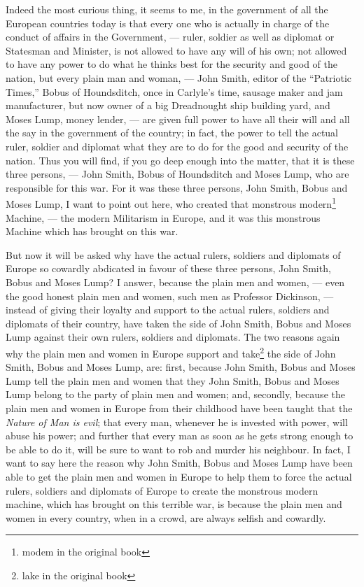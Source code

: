 Indeed the most curious thing, it seems to me, in the government of all the European countries today is that every one who is actually in charge of the conduct of affairs in the Government, --- ruler, soldier as well as diplomat or Statesman and Minister, is not allowed to have any will of his own; not allowed to have any power to do what he thinks best for the security and good of the nation, but every plain man and woman, --- John Smith, editor of the ``Patriotic Times,'' Bobus of Houndsditch, once in Carlyle's time, sausage maker and jam manufacturer, but now owner of a big Dreadnought ship building yard, and Moses Lump, money lender, --- are given full power to have all their will and all the say in the government of the country; in fact, the power to tell the actual ruler, soldier and diplomat what they are to do for the good and security of the nation.
Thus you will find, if you go deep enough into the matter, that it is these three persons, --- John Smith, Bobus of Houndsditch and Moses Lump, who are responsible for this war.
For it was these three persons, John Smith, Bobus and Moses Lump, I want to point out here, who created that monstrous modern\footnote{modem in the original book} Machine, --- the modern Militarism in Europe, and it was this monstrous Machine which has brought on this war.

But now it will be asked why have the actual rulers, soldiers and diplomats of Europe so cowardly abdicated in favour of these three persons, John Smith, Bobus and Moses Lump?
I answer, because the plain men and women, --- even the good honest plain men and women, such men as Professor Dickinson, --- instead of giving their loyalty and support to the actual rulers, soldiers and diplomats of their country, have taken the side of John Smith, Bobus and Moses Lump against their own rulers, soldiers and diplomats.
The two reasons again why the plain men and women in Europe support and take\footnote{lake in the original book} the side of John Smith, Bobus and Moses Lump, are: first, because John Smith, Bobus and Moses Lump tell the plain men and women that they John Smith, Bobus and Moses Lump belong to the party of plain men and women; and, secondly, because the plain men and women in Europe from their childhood have been taught that the \emph{Nature of Man is evil}; that every man, whenever he is invested with power, will abuse his power; and further that every man as soon as he gets strong enough to be able to do it, will be sure to want to rob and murder his neighbour.
In fact, I want to say here the reason why John Smith, Bobus and Moses Lump have been able to get the plain men and women in Europe to help them to force the actual rulers, soldiers and diplomats of Europe to create the monstrous modern machine, which has brought on this terrible war, is because the plain men and women in every country, when in a crowd, are always selfish and cowardly.

